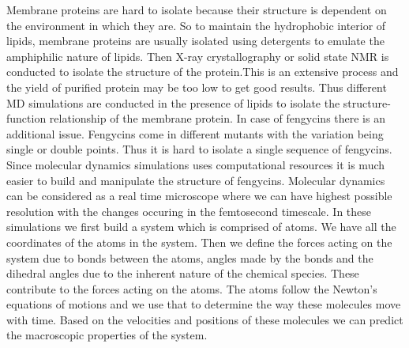 Membrane proteins are hard to isolate because their structure is 
dependent on the environment in which they are. So to maintain the 
hydrophobic interior of lipids, membrane proteins are usually isolated 
using detergents to emulate the amphiphilic nature of lipids. 
Then X-ray crystallography or solid state NMR is conducted to isolate the structure
of the protein.This is an extensive process and the yield of purified protein may
be too low to get good results. Thus different MD simulations are conducted 
in the presence of lipids to isolate the structure-function relationship of the membrane protein.
In case of fengycins there is an additional issue. Fengycins
come in different mutants with the variation
being single or double points.
Thus it is hard to isolate a single sequence of fengycins.
Since 
molecular dynamics simulations uses computational resources it is much 
easier to build and manipulate the structure of fengycins.
Molecular dynamics can be considered as a real time microscope
where we can have highest possible resolution with the changes occuring 
in the femtosecond timescale. 
In these simulations we first build a system which is comprised of atoms. 
We have all the coordinates of the atoms in the system. Then we define 
the forces acting on the system due to bonds between the atoms, angles 
made by the bonds and the dihedral angles due to the inherent nature of 
the chemical species. These contribute to the forces acting on the atoms.
The atoms follow the Newton's equations of motions and we use that to 
determine the way these molecules move with time.
Based on the velocities and positions of these molecules we can predict 
the macroscopic properties of the system. 

